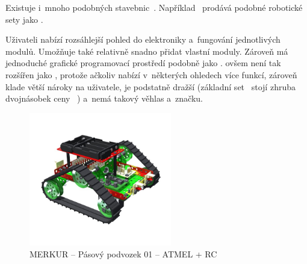 
Existuje i~mnoho podobných stavebnic~\cite{intorobotics_BestAlternativesToLegoMindstormsKits}. 
Například \fischerT ~prodává podobné robotické sety jako \lego{~}\cite{fischertechnik_ROBOTICS}. 

Uživateli nabízí rozsáhlejší pohled do elektroniky a~fungování jednotlivých modulů. 
Umožňuje také relativně snadno přidat vlastní moduly.
Zároveň má jednoduché grafické programovací prostředí podobně jako \lego. 
\FischerT{ }ovšem není tak rozšířen jako \legoM, protože ačkoliv nabízí v~některých ohledech více funkcí, zároveň klade větší nároky na uživatele, je podstatně dražší (základní set~\cite{fischertechnik_HelagoEshop_ROBOTICS-TXT-COMPETITION-SET} stojí zhruba dvojnásobek ceny ~\cite{lego_eduxeEshop_CoreSet}) a~nemá takový věhlas a~značku.



\begin{figure}[h]
	\centering
	\includegraphics[width=235px]{images/MERKUR_Pasovy-podvozek-01_ATMEL+RC.jpg}
	\caption[MERKUR -- Pásový podvozek 01 -- ATMEL + RC]{MERKUR -- Pásový podvozek 01 -- ATMEL + RC\protect\footnotemark}
	\label{fig:MERKUR_Pasovy-podvozek-01_ATMEL+RC}
\end{figure}

